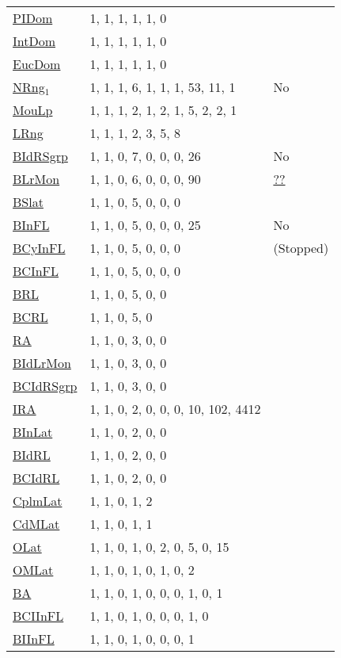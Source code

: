 {\begin{tabular}{|l|l|l|}
\hyperlink{PIDom}{PIDom}& 1, 1, 1, 1, 1, 0 &\\
\hyperlink{IntDom}{IntDom}& 1, 1, 1, 1, 1, 0 &\\
\hyperlink{EucDom}{EucDom}& 1, 1, 1, 1, 1, 0 &\\
\hyperlink{NRng$_1$}{NRng$_1$}& 1, 1, 1, 6, 1, 1, 1, 53, 11, 1 &No\\
\hyperlink{MouLp}{MouLp}& 1, 1, 1, 2, 1, 2, 1, 5, 2, 2, 1 &\\
\hyperlink{LRng}{LRng}& 1, 1, 1, 2, 3, 5, 8 &\\
\hyperlink{BIdRSgrp}{BIdRSgrp}& 1, 1, 0, 7, 0, 0, 0, 26 &No\\
\hyperlink{BLrMon}{BLrMon}& 1, 1, 0, 6, 0, 0, 0, 90 &\href{http://oeis.org/A305324}{??}\\
\hyperlink{BSlat}{BSlat}& 1, 1, 0, 5, 0, 0, 0 &\\
\hyperlink{BInFL}{BInFL}& 1, 1, 0, 5, 0, 0, 0, 25 &No\\
\hyperlink{BCyInFL}{BCyInFL}& 1, 1, 0, 5, 0, 0, 0 &(Stopped)\\
\hyperlink{BCInFL}{BCInFL}& 1, 1, 0, 5, 0, 0, 0&\\
\hyperlink{BRL}{BRL}& 1, 1, 0, 5, 0, 0&\\
\hyperlink{BCRL}{BCRL}& 1, 1, 0, 5, 0&\\
\hyperlink{RA}{RA}& 1, 1, 0, 3, 0, 0&\\
\hyperlink{BIdLrMon}{BIdLrMon}& 1, 1, 0, 3, 0, 0&\\
\hyperlink{BCIdRSgrp}{BCIdRSgrp}& 1, 1, 0, 3, 0, 0&\\
\hyperlink{IRA}{IRA}& 1, 1, 0, 2, 0, 0, 0, 10, 102, 4412&\\
\hyperlink{BInLat}{BInLat}& 1, 1, 0, 2, 0, 0&\\
\hyperlink{BIdRL}{BIdRL}& 1, 1, 0, 2, 0, 0&\\
\hyperlink{BCIdRL}{BCIdRL}& 1, 1, 0, 2, 0, 0&\\
\hyperlink{CplmLat}{CplmLat}& 1, 1, 0, 1, 2&\\
\hyperlink{CdMLat}{CdMLat}& 1, 1, 0, 1, 1&\\
\hyperlink{OLat}{OLat}& 1, 1, 0, 1, 0, 2, 0, 5, 0, 15&\\
\hyperlink{OMLat}{OMLat}& 1, 1, 0, 1, 0, 1, 0, 2&\\
\hyperlink{BA}{BA}& 1, 1, 0, 1, 0, 0, 0, 1, 0, 1&\\
\hyperlink{BCIInFL}{BCIInFL}& 1, 1, 0, 1, 0, 0, 0, 1, 0&\\
\hyperlink{BIInFL}{BIInFL}& 1, 1, 0, 1, 0, 0, 0, 1&\\

\end{tabular}}

